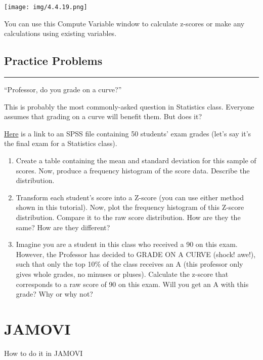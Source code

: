 \documentclass[]{book}
\begin{document}
\texttt{[image: img/4.4.19.png]}

You can use this Compute Variable window to calculate z-scores or make
any calculations using existing variables.

\subsection{Practice Problems}\label{practice-problems-3}

\begin{center}\rule{0.5\linewidth}{0.5pt}\end{center}

``Professor, do you grade on a curve?''

This is probably the most commonly-asked question in Statistics class.
Everyone assumes that grading on a curve will benefit them. But does it?

\href{https://github.com/CrumpLab/statisticsLab/blob/master/data/spssdata/StatsGrades.sav}{Here}
is a link to an SPSS file containing 50 students' exam grades (let's say
it's the final exam for a Statistics class).

\begin{enumerate}
\def\labelenumi{\arabic{enumi}.}
\item
  Create a table containing the mean and standard deviation for this
  sample of scores. Now, produce a frequency histogram of the score
  data. Describe the distribution.
\item
  Transform each student's score into a Z-score (you can use either
  method shown in this tutorial). Now, plot the frequency histogram of
  this Z-score distribution. Compare it to the raw score distribution.
  How are they the same? How are they different?
\item
  Imagine you are a student in this class who received a 90 on this
  exam. However, the Professor has decided to GRADE ON A CURVE (shock!
  awe!), such that only the top 10\% of the class receives an A (this
  professor only gives whole grades, no minuses or pluses). Calculate
  the z-score that corresponds to a raw score of 90 on this exam. Will
  you get an A with this grade? Why or why not?
\end{enumerate}

\section{JAMOVI}\label{jamovi-4}

How to do it in JAMOVI
\end{document}
